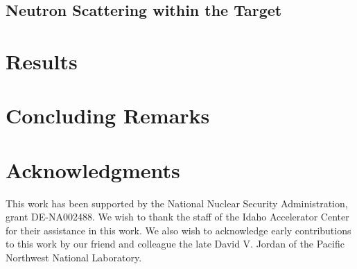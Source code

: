 \documentclass[%
 reprint,
 calc,
 amsmath,amssymb,
 aps,
 nofootinbib,
 linenumbers
]{revtex4-1}
\begin{document}
\subsection{Neutron Scattering within the Target}


\section{Results}


\section{Concluding Remarks}


\section{Acknowledgments}
This work has been supported by the National Nuclear Security Administration, grant DE-NA002488. We wish to thank the staff of the Idaho Accelerator Center for their assistance in this work. We also wish to acknowledge early contributions to this work by our friend and colleague the late David V. Jordan of the Pacific Northwest National Laboratory.

%

\end{document}
